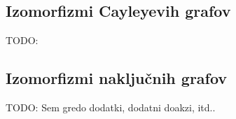 \documentclass[mat2, tisk]{fmfdelo}
\newcommand{\TODO}[1]{{\color{blue} TODO: #1}}
\begin{document}
            \subsection{Izomorfizmi Cayleyevih grafov}
            \label{dodatek:cayley}
            \TODO{}

            \subsection{Izomorfizmi naključnih grafov}
            \label{dodatek:naključni grafi}
            \TODO{Sem gredo dodatki, dodatni doakzi, itd..}
%

\end{document}

